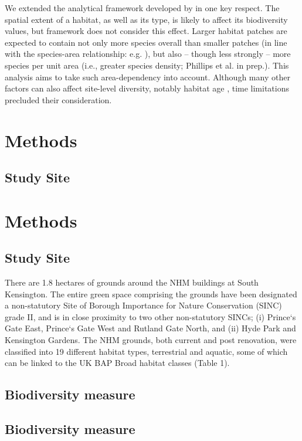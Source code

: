 We extended the analytical framework developed by \cite{Newbold:2015nat} in one key respect. The spatial extent of a habitat, as well as its type, is likely to affect its biodiversity values, but \cite{Newbold:2015nat} framework does not consider this effect.  Larger habitat patches are expected to contain not only more species overall than smaller patches (in line with the species-area relationship: e.g. \citealt{rosenzweig:1995species}), but also -- though less strongly -- more species per unit area (i.e., greater species density; Phillips et al. in prep.). This analysis aims to take such area-dependency into account. Although many other factors can also affect site-level diversity, notably habitat age \citep{Sattler:2010le}, time limitations precluded their consideration.

\ifappendixStyle %
\section{Methods}
\subsection{Study Site}%
\else
\section*{Methods}
\subsection*{Study Site}
\fi

There are 1.8 hectares of grounds around the NHM buildings at South Kensington. The entire green space comprising the grounds have been designated a non-statutory Site of Borough Importance for Nature Conservation (SINC) grade II, and is in close proximity to two other non-statutory SINCs; (i) Prince`s Gate East, Prince`s Gate West and Rutland Gate North, and (ii) Hyde Park and Kensington Gardens. The NHM grounds, both current and post renovation, were classified into 19 different habitat types, terrestrial and aquatic, some of which can be linked to the UK BAP Broad habitat classes (Table 1).

\ifappendixStyle %
\subsection{Biodiversity measure}%
\else
\subsection*{Biodiversity measure}
\fi

